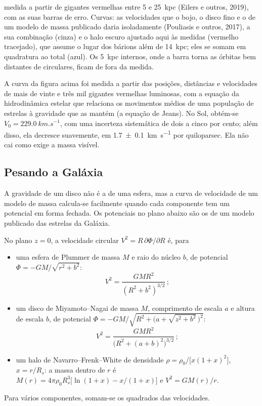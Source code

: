\begin{omfigure}
{medida a partir de gigantes vermelhas entre 5 e \qty{25}{kpc} (Eilers
e outros, 2019), com as suas barras de erro. Curvas: as velocidades que o
bojo, o disco fino e o  de um modelo de massa publicado daria
isoladamente (Pouliasis e outros, 2017), a sua combinação (cinza) e
o halo escuro ajustado aqui às medidas (vermelho tracejado), que assume
o lugar dos bárions além de \qty{14}{kpc}; eles se somam em quadratura ao
total (azul). Os \qty{5}{kpc} internos, onde a barra torna as órbitas
bem distantes de circulares, ficam de fora da medida.}\label{fig:b3:milky-way-galaxies:rotation}
\end{omfigure}

A curva da figura acima foi medida a partir das posições, distâncias
e velocidades de mais de vinte e três mil gigantes vermelhas luminosas,
com a equação da hidrodinâmica estelar que relaciona os movimentos médios
de uma população de estrelas à gravidade que as mantém (a equação de Jeans).
No Sol, obtém-se $V_0 = \qty{229.0}{km.s^{-1}}$, com uma incerteza sistemática
de dois a cinco por cento; além disso, ela decresce suavemente, em
\qty[separate-uncertainty=true]{1.7 \pm 0.1}{km.s^{-1}} por quiloparsec. Ela
não cai como exige a massa visível.

\subsection*{Pesando a Galáxia}

A gravidade de um disco não é a de uma esfera, mas a curva de velocidade
de um modelo de massa calcula-se facilmente quando cada componente tem um potencial em
forma fechada. Os potenciais no plano abaixo são os de um modelo publicado
das estrelas da Galáxia.

\begin{proposition}\label{prop:b3:milky-way-galaxies:models}
No plano $z = 0$, a velocidade circular $V^2 = R\,\partial\Phi/\partial R$
é, para
\begin{itemize}
\item uma esfera de Plummer de massa $M$ e raio do núcleo $b$, de potencial
  $\Phi = -GM/\sqrt{r^2 + b^2}$:
  \[ V^2 = \frac{GMR^2}{(R^2 + b^2)^{3/2}}\,; \]
\item um disco de Miyamoto--Nagai de massa $M$, comprimento de escala $a$ e
  altura de escala $b$, de potencial
  $\Phi = -GM\big/\sqrt{R^2 + \bigl(a + \sqrt{z^2 + b^2}\,\bigr)^2}$:
  \[ V^2 = \frac{GMR^2}{\bigl(R^2 + (a + b)^2\bigr)^{3/2}}\,; \]
\item um halo de Navarro--Frenk--White de densidade
  $\rho = \rho_0\big/\bigl[x(1 + x)^2\bigr]$, $x = r/R_s$: a massa dentro de $r$
  é $M(r) = 4\pi\rho_0R_s^3\bigl[\ln(1 + x) - x/(1 + x)\bigr]$ e
  $V^2 = GM(r)/r$.
\end{itemize}
Para vários componentes, somam-se os quadrados das velocidades.
\end{proposition}

